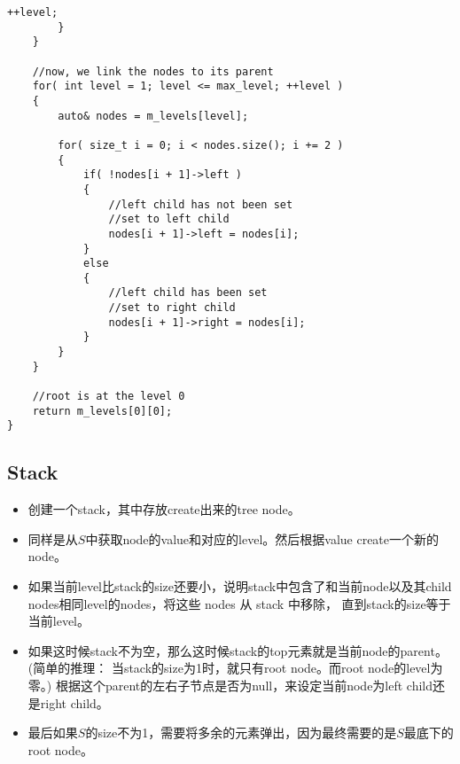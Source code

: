 \begin{lstlisting}[style=customc, caption={Hash Map}]
            ++level;
        }
    }

    //now, we link the nodes to its parent
    for( int level = 1; level <= max_level; ++level )
    {
        auto& nodes = m_levels[level];

        for( size_t i = 0; i < nodes.size(); i += 2 )
        {
            if( !nodes[i + 1]->left )
            {
                //left child has not been set
                //set to left child
                nodes[i + 1]->left = nodes[i];
            }
            else
            {
                //left child has been set
                //set to right child
                nodes[i + 1]->right = nodes[i];
            }
        }
    }

    //root is at the level 0
    return m_levels[0][0];
}
\end{lstlisting}


\subsection{Stack}
\begin{itemize}
\item 创建一个stack，其中存放create出来的tree node。
\item 同样是从$S$中获取node的value和对应的level。然后根据value create一个新的node。
\item 如果当前level比stack的size还要小，说明stack中包含了和当前node以及其child nodes相同level的nodes，将这些 nodes 从 stack 中移除， 直到stack的size等于当前level。
\item 如果这时候stack不为空，那么这时候stack的top元素就是当前node的parent。(简单的推理： 当stack的size为1时，就只有root node。而root node的level为零。) 根据这个parent的左右子节点是否为null，来设定当前node为left child还是right child。
\item 最后如果$S$的size不为1，需要将多余的元素弹出，因为最终需要的是$S$最底下的root node。
\end{itemize}

